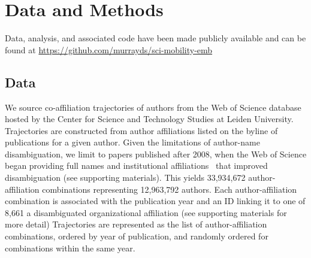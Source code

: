\documentclass[12pt]{article} %
\begin{document}
%
%
\section*{Data and Methods}
\label{sec:datamethods} %

Data, analysis, and associated code have been made publicly available and can be found at \url{https://github.com/murrayds/sci-mobility-emb}

\subsection*{Data}
We source co-affiliation trajectories of authors from the Web of Science database hosted by the Center for Science and Technology Studies at Leiden University.
Trajectories are constructed from author affiliations listed on the byline of publications for a given author.
Given the limitations of author-name disambiguation, we limit to papers published after 2008, when the Web of Science began providing full names and institutional affiliations~\autocite{caron2014disambiguation} that improved disambiguation (see supporting materials).
This yields 33,934,672 author-affiliation combinations representing 12,963,792 authors.
Each author-affiliation combination is associated with the publication year and an ID linking it to one of 8,661 a disambiguated organizational affiliation (see supporting materials for more detail)
Trajectories are represented as the list of author-affiliation combinations, ordered by year of publication, and randomly ordered for combinations within the same year.
\end{document}
